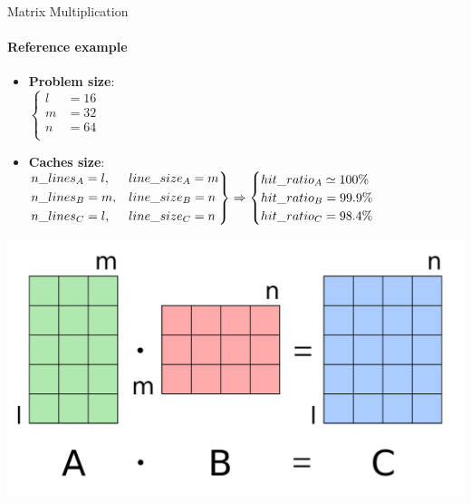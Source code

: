 \documentclass[handout,aspectratio=169]{beamer}
\begin{document}
\begin{frame}{Matrix Multiplication}
	\framesubtitle{Reference example}
	\begin{minipage}{.77\textwidth}
		\begin{itemize}
			\item \textbf{Problem size}:\\
				$\begin{cases}
					l &= 16 \\
					m &= 32 \\
					n &= 64 \\
				\end{cases}$
			\item \textbf{Caches size}:\\
				$\begin{rcases}
					n\_lines_A = l, & line\_size_A = m \\
					n\_lines_B = m, & line\_size_B = n \\
					n\_lines_C = l, & line\_size_C = n \\
				\end{rcases}
				\Rightarrow
				\begin{cases}
					hit\_ratio_A \simeq 100\% \\
					hit\_ratio_B = 99.9\% \\
					hit\_ratio_C = 98.4\% \\
				\end{cases}$
		\end{itemize}
	\end{minipage}
	\begin{minipage}{.22\textwidth}
		\begin{center}
			\includegraphics[width=.9\textwidth]{matmul.png}
		\end{center}
	\end{minipage}
\end{frame}
\end{document}
